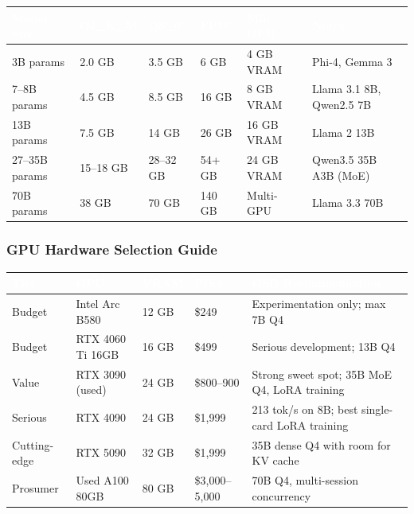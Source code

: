 \documentclass[11pt,letterpaper]{article}
\newcommand{\tableheader}[1]{\textbf{\sffamily\textcolor{white}{#1}}}
\begin{document}
\begin{center}
\begin{tabularx}{\textwidth}{L{2.5cm}C{2cm}C{2cm}C{2cm}C{2cm}X}
\toprule
{}
\tableheader{Model Size} & \tableheader{Q4\_K\_M} & \tableheader{Q8\_0} & \tableheader{FP16} & \tableheader{Min GPU} & \tableheader{Notes} \\
\midrule
3B params & 2.0 GB & 3.5 GB & 6 GB & 4 GB VRAM & Phi-4, Gemma 3 \\
7--8B params & 4.5 GB & 8.5 GB & 16 GB & 8 GB VRAM & Llama 3.1 8B, Qwen2.5 7B \\
13B params & 7.5 GB & 14 GB & 26 GB & 16 GB VRAM & Llama 2 13B \\
27--35B params & 15--18 GB & 28--32 GB & 54+ GB & 24 GB VRAM & Qwen3.5 35B A3B (MoE) \\
70B params & 38 GB & 70 GB & 140 GB & Multi-GPU & Llama 3.3 70B \\
\bottomrule
\end{tabularx}
\end{center}

\subsubsection{GPU Hardware Selection Guide}

\begin{center}
\begin{tabularx}{\textwidth}{L{2cm}L{2.5cm}C{2cm}C{2cm}X}
\toprule
{}
\tableheader{Tier} & \tableheader{GPU} & \tableheader{VRAM} & \tableheader{Price} & \tableheader{GSD Recommendation} \\
\midrule
Budget & Intel Arc B580 & 12 GB & \$249 & Experimentation only; max 7B Q4 \\
Budget & RTX 4060 Ti 16GB & 16 GB & \$499 & Serious development; 13B Q4 \\
Value & RTX 3090 (used) & 24 GB & \$800--900 & Strong sweet spot; 35B MoE Q4, LoRA training \\
Serious & RTX 4090 & 24 GB & \$1,999 & 213 tok/s on 8B; best single-card LoRA training \\
Cutting-edge & RTX 5090 & 32 GB & \$1,999 & 35B dense Q4 with room for KV cache \\
Prosumer & Used A100 80GB & 80 GB & \$3,000--5,000 & 70B Q4, multi-session concurrency \\
\bottomrule
\end{tabularx}
\end{center}
\end{document}
